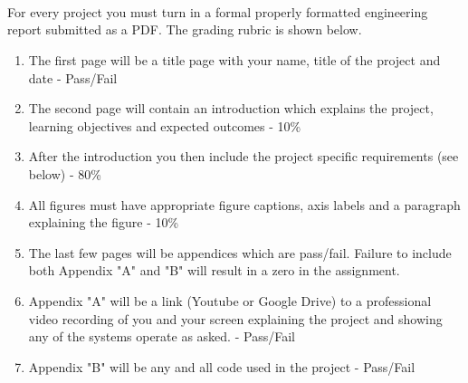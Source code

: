 \ \\
\ \\
\ \\
\noindent For every project you must turn in a formal properly formatted engineering report submitted as a PDF. The grading rubric is shown below.

\begin{enumerate}[itemsep=-5pt]
\item The first page will be a title page with your name, title of the project and date - Pass/Fail 	
\item The second page will contain an introduction which explains the project, learning objectives and expected outcomes - 10\%
\item After the introduction you then include the project specific requirements (see below) - 80\%
\item All figures must have appropriate figure captions, axis labels and a paragraph explaining the figure - 10\%
\item The last few pages will be appendices which are pass/fail. Failure to include both Appendix "A" and "B" will result in a zero in the assignment.
\item Appendix "A" will be a link (Youtube or Google Drive) to a professional video recording of you and your screen explaining the project and showing any of the systems operate as asked. - Pass/Fail
\item Appendix "B" will be any and all code used in the project - Pass/Fail
\end{enumerate}


